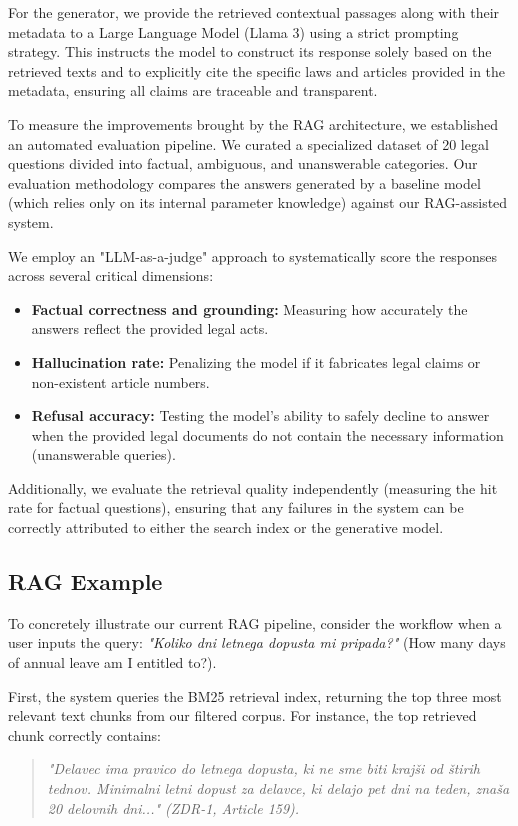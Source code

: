 \documentclass[fleqn,moreauthors,10pt]{ds_report}
\begin{document}
For the generator, we provide the retrieved contextual passages along with their metadata to a Large Language Model (Llama 3) using a strict prompting strategy.
This instructs the model to construct its response solely based on the retrieved texts and to explicitly cite the specific laws and articles provided in the metadata,
ensuring all claims are traceable and transparent.

To measure the improvements brought by the RAG architecture, we established an automated evaluation pipeline.
We curated a specialized dataset of 20 legal questions divided into factual, ambiguous, and unanswerable categories.
Our evaluation methodology compares the answers generated by a baseline model (which relies only on its internal parameter knowledge) against our RAG-assisted system.

We employ an "LLM-as-a-judge" approach to systematically score the responses across several critical dimensions:
\begin{itemize}[noitemsep]
	\item \textbf{Factual correctness and grounding:} Measuring how accurately the answers reflect the provided legal acts.
	\item \textbf{Hallucination rate:} Penalizing the model if it fabricates legal claims or non-existent article numbers.
	\item \textbf{Refusal accuracy:} Testing the model's ability to safely decline to answer when the provided legal documents do not contain the necessary information (unanswerable queries).
\end{itemize}

Additionally, we evaluate the retrieval quality independently (measuring the hit rate for factual questions), ensuring that any failures in the system can be correctly
attributed to either the search index or the generative model.

\subsection*{RAG Example}

To concretely illustrate our current RAG pipeline, consider the workflow when a user inputs the query:
\textit{"Koliko dni letnega dopusta mi pripada?"} (How many days of annual leave am I entitled to?).

First, the system queries the BM25 retrieval index, returning the top three most relevant text chunks from our filtered corpus.
For instance, the top retrieved chunk correctly contains:
\begin{quote}
\textit{"Delavec ima pravico do letnega dopusta, ki ne sme biti krajši od štirih tednov. Minimalni letni dopust za delavce, ki delajo pet dni na teden, znaša 20 delovnih dni..." (ZDR-1, Article 159).}
\end{quote}
\end{document}
